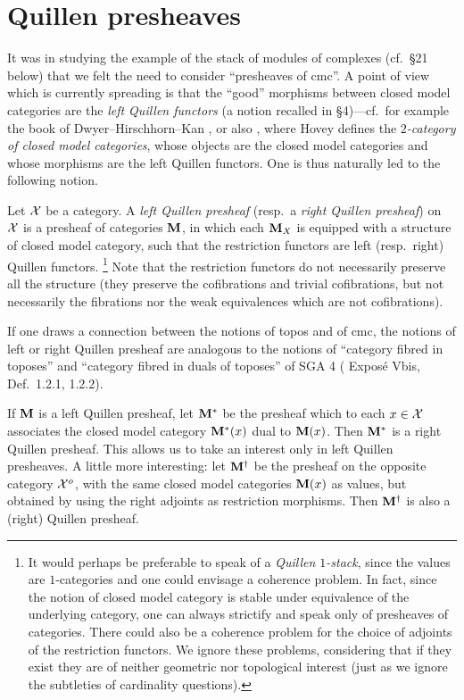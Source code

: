 
\clearpage
\section{Quillen presheaves}
\label{quipage}

It was in studying the example of the stack of modules of complexes (cf.\ \S21
below) that we felt the need to consider ``presheaves of cmc''.
A point of view which is currently spreading is that the ``good'' morphisms
between closed model categories are the {\em left Quillen functors} (a notion
recalled in \S4)---cf.\ for example the book of Dwyer--Hirschhorn--Kan
\cite{DHK}, or also \cite{HoveyBook}, where Hovey defines the {\em $2$-category
of closed model categories}, whose objects are the closed model categories and
whose morphisms are the left Quillen functors.
One is thus naturally led to the following notion.


Let ${\cal X}$ be a category. A {\em left Quillen presheaf} (resp.\ a {\em right
Quillen presheaf}) on ${\cal X}$ is a presheaf of categories ${\bf M}$, in which each
${\bf M}_X$ is equipped with a structure of closed model category, such that the
restriction functors are left (resp.\ right) Quillen functors.
\footnote{
It would perhaps be preferable to speak of a {\em Quillen $1$-stack}, since
the values are $1$-categories and one could envisage a coherence problem. In
fact, since the notion of closed model category is stable under equivalence of
the underlying category, one can always strictify and speak only of presheaves
of categories. There could also be a coherence problem for the choice of
adjoints of the restriction functors. We ignore these problems, considering
that if they exist they are of neither geometric nor topological interest
(just as we ignore the subtleties of cardinality questions).}
Note that the restriction functors do not necessarily preserve all the
structure (they preserve the cofibrations and trivial cofibrations, but not
necessarily the fibrations nor the weak equivalences which are not
cofibrations).

If one draws a connection between the notions of topos and of cmc, the notions
of left or right Quillen presheaf are analogous to the notions of ``category
fibred in toposes'' and ``category fibred in duals of toposes'' of SGA 4
(\cite{SGA4b} Exposé Vbis, Def.~1.2.1, 1.2.2).

If ${\bf M}$ is a left Quillen presheaf, let ${\bf M}^{\ast}$ be the presheaf
which to each $x\in {\cal X}$ associates the closed model category ${\bf
M}^{\ast}(x)$ dual to ${\bf M} (x)$. Then ${\bf M}^{\ast}$ is a right Quillen
presheaf. This allows us to take an interest only in left Quillen presheaves. A
little more interesting: let ${\bf M}^{\dag}$ be the presheaf on the opposite
category ${\cal X} ^o$, with the same closed model categories ${\bf M}(x)$ as
values, but obtained by using the right adjoints as restriction morphisms.
Then ${\bf M}^{\dag}$ is also a (right) Quillen presheaf.

